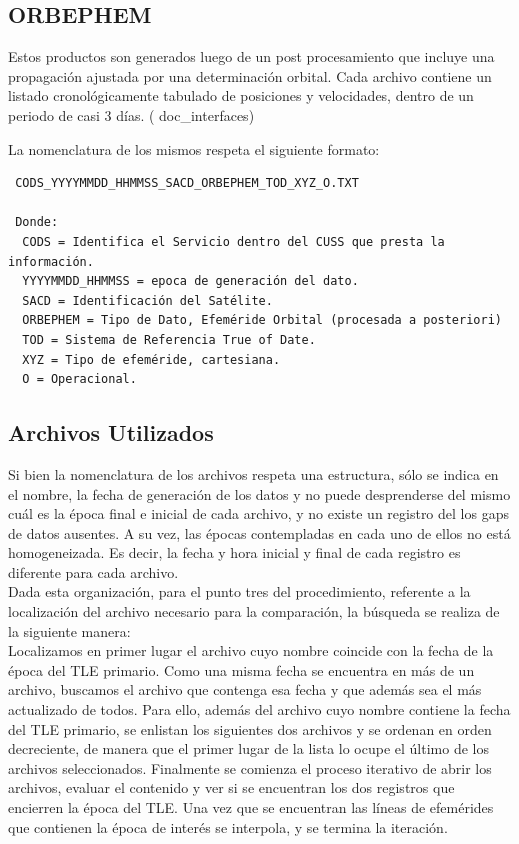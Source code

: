 \subsection*{ORBEPHEM}
Estos productos son generados luego de un post procesamiento que incluye una propagaci\'on ajustada por una determinaci\'on orbital. 
Cada archivo contiene un listado cronol\'ogicamente tabulado de posiciones y velocidades, dentro de un periodo de casi 3 d\'ias. ( doc\_interfaces)

La nomenclatura de los mismos respeta el siguiente formato:\\
\begin{verbatim}
 CODS_YYYYMMDD_HHMMSS_SACD_ORBEPHEM_TOD_XYZ_O.TXT
 
 Donde:
  CODS = Identifica el Servicio dentro del CUSS que presta la información.
  YYYYMMDD_HHMMSS = epoca de generación del dato.
  SACD = Identificación del Satélite.
  ORBEPHEM = Tipo de Dato, Efeméride Orbital (procesada a posteriori)
  TOD = Sistema de Referencia True of Date.
  XYZ = Tipo de efeméride, cartesiana.
  O = Operacional. 
\end{verbatim}


\subsection*{Archivos Utilizados}
Si bien la nomenclatura de los archivos respeta una estructura, s\'olo se indica en el nombre, la fecha de generaci\'on de los datos y no puede desprenderse del mismo cu\'al es la \'epoca final e inicial de cada archivo, y no existe un registro del los gaps de datos ausentes. A su vez, las \'epocas contempladas en cada uno de ellos no está homogeneizada. Es decir, la fecha y hora inicial y final de cada registro es diferente para cada archivo.\\
Dada esta organizaci\'on, para el punto tres del procedimiento, referente a la localizaci\'on del archivo necesario para la comparaci\'on, la b\'usqueda se realiza de la siguiente manera:\\
Localizamos en primer lugar el archivo cuyo nombre coincide con la fecha de la \'epoca del TLE primario.
Como una misma fecha se encuentra en m\'as de un archivo, buscamos el archivo que contenga esa fecha y que adem\'as sea el m\'as actualizado de todos. Para ello, además del archivo cuyo nombre contiene la fecha del TLE primario, se enlistan los siguientes dos archivos y se ordenan en orden decreciente, de manera que el primer lugar de la lista lo ocupe el \'ultimo de los archivos seleccionados. Finalmente se comienza el proceso iterativo de abrir los archivos, evaluar el contenido y ver si se encuentran los dos registros que encierren la \'epoca del TLE.
Una vez que se encuentran las l\'ineas de efem\'erides que contienen la \'epoca de inter\'es se interpola, y se termina la iteraci\'on.

